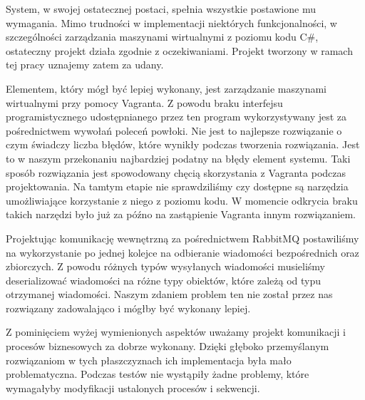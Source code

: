 \documentclass[../podsumowanie.tex]{subfiles}
\begin{document}
\label{final_system_form}

System, w swojej ostatecznej postaci, spełnia wszystkie postawione mu wymagania. Mimo trudności w implementacji niektórych funkcjonalności, w szczególności zarządzania maszynami wirtualnymi z poziomu kodu C\#, ostateczny projekt działa zgodnie z oczekiwaniami. Projekt tworzony w ramach tej pracy uznajemy zatem za udany.

Elementem, który mógł być lepiej wykonany, jest zarządzanie maszynami wirtualnymi przy pomocy Vagranta. Z powodu braku interfejsu programistycznego udostępnianego przez ten program wykorzystywany jest za pośrednictwem wywołań poleceń powłoki. Nie jest to najlepsze rozwiązanie o czym świadczy liczba błędów, które wynikły podczas tworzenia rozwiązania. Jest to w naszym przekonaniu najbardziej podatny na błędy element systemu. Taki sposób rozwiązania jest spowodowany chęcią skorzystania z Vagranta podczas projektowania. Na tamtym etapie nie sprawdziliśmy czy dostępne są narzędzia umożliwiające korzystanie z niego z poziomu kodu. W momencie odkrycia braku takich narzędzi było już za późno na zastąpienie Vagranta innym rozwiązaniem.

Projektując komunikację wewnętrzną za pośrednictwem RabbitMQ postawiliśmy na wykorzystanie po jednej kolejce na odbieranie wiadomości bezpośrednich oraz zbiorczych.
Z powodu różnych typów wysyłanych wiadomości musieliśmy deserializować wiadomości na różne typy obiektów, które zależą od typu otrzymanej wiadomości.
Naszym zdaniem problem ten nie został przez nas rozwiązany zadowalająco i mógłby być wykonany lepiej.

Z pominięciem wyżej wymienionych aspektów uważamy projekt komunikacji i procesów biznesowych za dobrze wykonany.
Dzięki głęboko przemyślanym rozwiązaniom w tych płaszczyznach ich implementacja była mało problematyczna.
Podczas testów nie wystąpiły żadne problemy, które wymagałyby modyfikacji ustalonych procesów i sekwencji.
\end{document}
